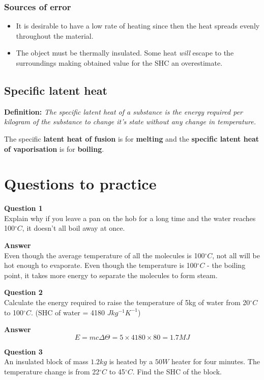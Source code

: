 \documentclass{article}
\begin{document}
\subsubsection*{Sources of error}
\begin{itemize}
	\item It is desirable to have a low rate of heating since then the heat
	spreads evenly throughout the material.
	\item The object must be thermally insulated. Some heat \textit{will} 
	escape to the surroundings making obtained value for the SHC an
	overestimate.
\end{itemize}

\subsection*{Specific latent heat}
\textbf{Definition: }\textit{The specific latent heat of a substance is the
energy required per kilogram of the substance to change it's state without any
change in temperature.}

The specific \textbf{latent heat of fusion} is for \textbf{melting} and the
\textbf{specific latent heat of vaporisation} is for \textbf{boiling}.

\section*{Questions to practice}
\textbf{Question 1}\\
Explain why if you leave a pan on  the hob for a long time and the water reaches
100$^{\circ}C$, it doesn't all boil away at once.

\textbf{Answer}\\
Even though the average temperature of all the molecules is 100$^{\circ}C$, not
all will be hot enough to evaporate. Even though the temperature is
100$^{\circ}C$ - the boiling point, it takes more energy to separate the
molecules to form steam.

\textbf{Question 2}\\
Calculate the energy required to raise the temperature of 5kg of water from
20$^{\circ}C$ to 100$^{\circ}C$. (SHC of water = 4180 $Jkg^{-1}K^{-1}$)

\textbf{Answer}\\
\[
	E = mc \Delta \Theta = 5 \times 4180 \times 80 = 1.7MJ
\]

\newpage

\textbf{Question 3}\\
An insulated block of mass $1.2kg$ is heated by a $50W$ heater for four minutes.
The temperature change is from 22$^{\circ}C$ to 45$^{\circ}C$. Find the SHC of
the block.
\end{document}
